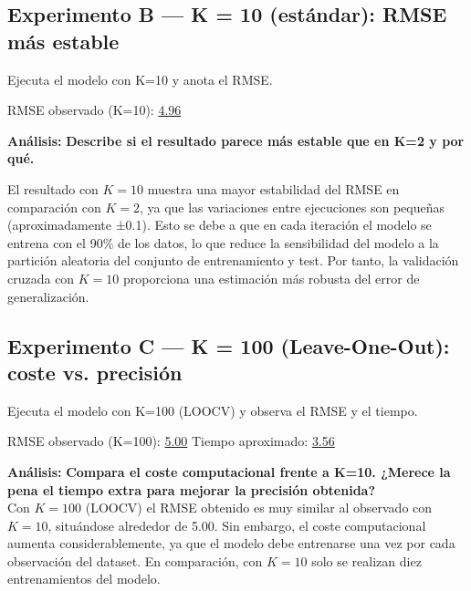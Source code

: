 \documentclass[12pt,oneside]{book}
\begin{document}
\subsection{Experimento B — K = 10 (estándar): RMSE más estable}

\noindent Ejecuta el modelo con K=10 y anota el RMSE.

\begin{center}
\end{center}

\noindent RMSE observado (K=10): \underline{4.96}

\vspace{0.4cm}
\noindent\textbf{Análisis:}
\textbf{Describe si el resultado parece más estable que en K=2 y por qué.}

El resultado con $K=10$ muestra una mayor estabilidad del RMSE en comparación con $K=2$, ya que las variaciones entre ejecuciones son pequeñas (aproximadamente ±0.1). Esto se debe a que en cada iteración el modelo se entrena con el 90\% de los datos, lo que reduce la sensibilidad del modelo a la partición aleatoria del conjunto de entrenamiento y test. Por tanto, la validación cruzada con $K=10$ proporciona una estimación más robusta del error de generalización.

\vspace{1.2cm}

\subsection{Experimento C — K = 100 (Leave-One-Out): coste vs. precisión}

\noindent Ejecuta el modelo con K=100 (LOOCV) y observa el RMSE y el tiempo.

\vspace{0.2cm}
\begin{center}
\end{center}

\noindent RMSE observado (K=100): \underline{5.00} \quad
Tiempo aproximado: \underline{3.56}

\vspace{0.4cm}
\noindent\textbf{Análisis:}
\textbf{Compara el coste computacional frente a K=10. ¿Merece la pena el tiempo extra para mejorar la precisión obtenida?} \\

Con $K=100$ (LOOCV) el RMSE obtenido es muy similar al observado con $K=10$, situándose alrededor de 5.00. Sin embargo, el coste computacional aumenta considerablemente, ya que el modelo debe entrenarse una vez por cada observación del dataset. En comparación, con $K=10$ solo se realizan diez entrenamientos del modelo. \\
\end{document}
